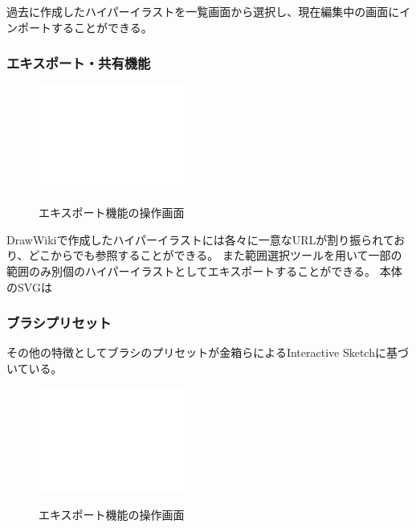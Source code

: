 過去に作成したハイパーイラストを一覧画面から選択し、現在編集中の画面にインポートすることができる。

\subsubsection{エキスポート・共有機能}

\begin{figure}[htbp]
    \begin{center}
    {\includegraphics[width=50mm]{images/testimage.png}} \end{center}
    \caption{エキスポート機能の操作画面}
    \label{exporting}
\end{figure}

DrawWikiで作成したハイパーイラストには各々に一意なURLが割り振られており、どこからでも参照することができる。
また範囲選択ツールを用いて一部の範囲のみ別個のハイパーイラストとしてエキスポートすることができる。
本体のSVGは

\subsubsection{ブラシプリセット}
その他の特徴としてブラシのプリセットが金箱らによるInteractive Sketch\cite{130004638060}に基づいている。


\begin{figure}[htbp]
    \begin{center}
    {\includegraphics[width=50mm]{images/testimage.png}} \end{center}
    \caption{エキスポート機能の操作画面}
    \label{interacive}
\end{figure}